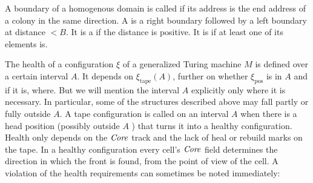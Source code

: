 \documentclass[11pt]{memoir}
\theoremstyle{definition} %
\newcommand{\fld}[1]{\ensuremath{\textit{#1\/}}}
\def\B{B}
\newcommand{\pos}{\mathrm{pos}}
\newcommand{\tape}{\mathrm{tape}}
\newcommand{\Core}{\fld{Core}}
\newcommand{\Drift}{\fld{Drift}}
\begin{document}
\begin{definition}[Boundaries]%

A boundary of a homogenous domain is called  if its address is the end 
address of a colony in the same direction.
A  
is a right boundary followed by a left boundary at distance \( <\B \).
It is a  if the distance is positive.
It is  if at least one of its elements is.
\end{definition}

The health of a configuration \( \xi \) of a generalized Turing machine 
\( M \) is defined over a certain interval \( A \).
It depends on \( \xi_{\tape}(A) \), further on whether \( \xi_{\pos} \) is in \( A \) and
if it is, where.
But we will mention the interval \( A \) explicitly only where it is necessary.
In particular, some of the structures described above may fall partly or fully
outside \( A \).
A tape configuration is called  on an interval \( A \)
when there is a head position (possibly outside \( A \) ) that turns it into a healthy configuration.
Health only depends on the \( \Core \) track
and the lack of heal or rebuild marks on the tape.
In a healthy configuration every cell's \( \Core \) field
determines the direction in which the front is found, from the point of
view of the cell.
A violation of the health requirements can sometimes be noted immediately:


\end{document}
